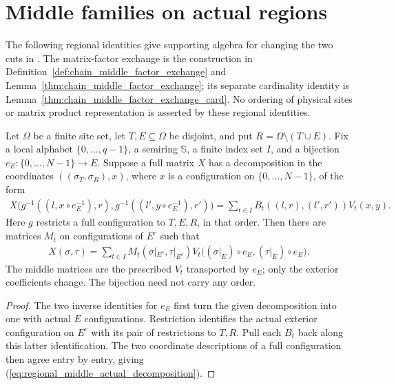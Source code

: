 \section{Middle families on actual regions}

The following regional identities give supporting algebra for changing
the two cuts in
\cite[Proposition~5.7]{Arad2016RigorousRG}.
The matrix-factor exchange is the construction in
Definition~\ref{def:chain_middle_factor_exchange} and
Lemma~\ref{thm:chain_middle_factor_exchange}; its separate cardinality
identity is Lemma~\ref{thm:chain_middle_factor_exchange_card}.
No ordering of physical sites or matrix product representation is asserted
by these regional identities.

\begin{lemma}
    \label{thm:regional_middle_from_numbered_three_regions}
    \leanok
    Let $\Omega$ be a finite site set, let $T,E\subseteq\Omega$ be disjoint,
    and put $R=\Omega\setminus(T\cup E)$. Fix a local alphabet
    $\{0,\ldots,q-1\}$, a semiring $\mathbb S$, a finite index set $I$,
    and a bijection $e_E:\{0,\ldots,N-1\}\to E$.
    Suppose a full matrix $X$ has a decomposition in the coordinates
    $((\sigma_T,\sigma_R),x)$, where $x$ is a configuration on
    $\{0,\ldots,N-1\}$, of the form
    \begin{align}
        X\bigl(g^{-1}((l,x\circ e_E^{-1}),r),
        g^{-1}((l',y\circ e_E^{-1}),r')\bigr)
        =\sum_{t\in I}B_t((l,r),(l',r'))V_t(x,y).
        \label{eq:regional_middle_numbered_decomposition}
    \end{align}
    Here $g$ restricts a full configuration to $T,E,R$, in that order.
    Then there are matrices $M_t$ on configurations of $E^c$ such that
    \begin{align}
        X(\sigma,\tau)=\sum_{t\in I}
        M_t(\sigma|_{E^c},\tau|_{E^c})
        V_t\bigl((\sigma|_E)\circ e_E,(\tau|_E)\circ e_E\bigr).
        \label{eq:regional_middle_actual_decomposition}
    \end{align}
    The middle matrices are the prescribed $V_t$ transported by $e_E$; only
    the exterior coefficients change. The bijection need not carry any order.
\end{lemma}
\begin{proof}\leanok
    The two inverse identities for $e_E$ first turn the given decomposition
    into one with actual $E$ configurations. Restriction identifies the actual
    exterior configuration on $E^c$ with its pair of restrictions to $T,R$.
    Pull each $B_t$ back along this latter identification. The two coordinate
    descriptions of a full configuration then agree entry by entry, giving
    (\ref{eq:regional_middle_actual_decomposition}).
\end{proof}

